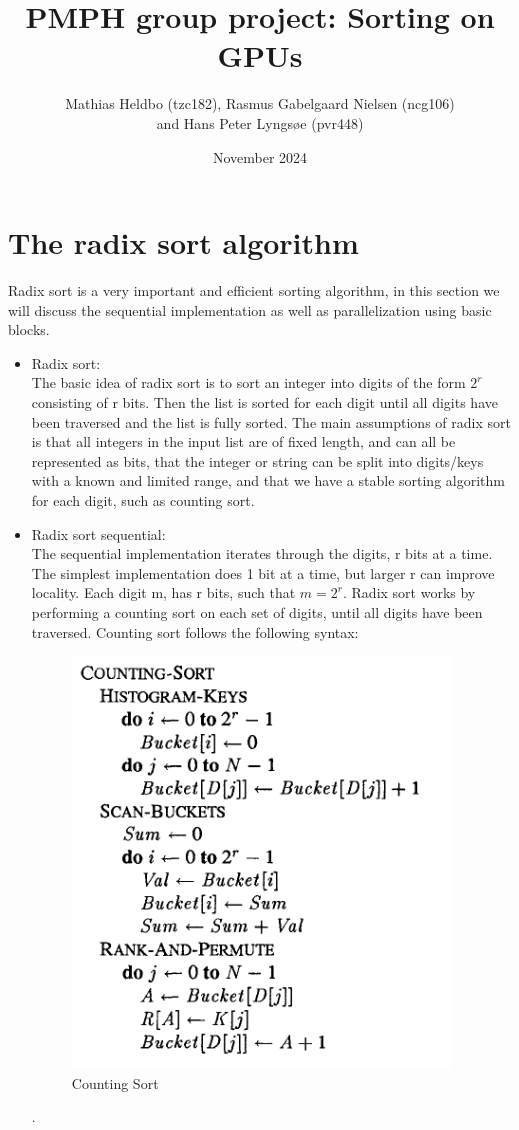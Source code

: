 \documentclass{article}
\title{PMPH group project: Sorting on GPUs}
\author{Mathias Heldbo (tzc182), Rasmus Gabelgaard Nielsen (ncg106) \\ and Hans Peter Lyngsøe (pvr448)}
\date{November 2024}
\begin{document}
\maketitle

\section{The radix sort algorithm }
Radix sort is a very important and efficient sorting algorithm, in this section we will discuss the sequential implementation as well as parallelization using basic blocks.
\begin{itemize}
\item Radix sort: \\
The basic idea of radix sort is to sort an integer into digits of the form $2^r$ consisting of r bits. Then the list is sorted for each digit until all digits have been traversed and the list is fully sorted. The main assumptions of radix sort is that all integers in the input list are of fixed length, and can all be represented as bits, that the integer or string can be split into digits/keys with a known and limited range, and that we have a stable sorting algorithm for each digit, such as counting sort. 
\item Radix sort sequential: \\
The sequential implementation iterates through the digits, r bits at a time. The simplest implementation does 1 bit at a time, but larger r can improve locality. Each digit m, has r bits, such that $m = 2^r$. Radix sort works by performing a counting sort on each set of digits, until all digits have been traversed. Counting sort follows the following syntax: 
\begin{figure} [H]
    \includegraphics[width=0.5\linewidth]{images/count_sort.PNG}
    \caption{Counting Sort \citep{zagharadixvector}}
    \label{fig:enter-label}
\end{figure}.


\end{itemize}
\end{document}
